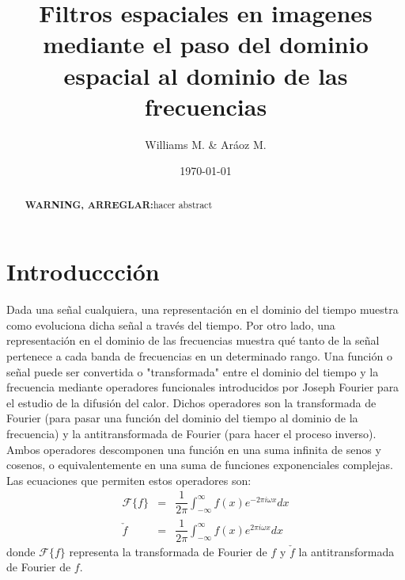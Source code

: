 \documentclass[11pt,a4paper]{emulateapj}
\def \warn {{\sffamily\bfseries\large WARNING, ARREGLAR:}}
\begin{document}
\title{Filtros espaciales en imagenes mediante el paso del dominio espacial al dominio de las frecuencias}
\author{Williams M. \& Aráoz M.}
\date{\today}


\begin{abstract}
\warn{hacer abstract}
\end{abstract}

\maketitle




\section{Introduccción}
\label{sec:introduccion}






Dada una señal cualquiera, una representación en el dominio del tiempo muestra como evoluciona dicha señal
a través del tiempo. Por otro lado, una representación en el dominio de las frecuencias muestra qué tanto de 
la señal pertenece a cada banda de frecuencias en un determinado rango. \citet*{wiki10} Una función o señal puede ser convertida
o "transformada" entre el dominio del tiempo y la frecuencia mediante operadores funcionales introducidos por 
Joseph Fourier para el estudio de la difusión del calor. Dichos operadores son la transformada de Fourier (para
pasar una función del dominio del tiempo al dominio de la frecuencia) y la antitransformada de Fourier (para hacer
el proceso inverso). Ambos operadores descomponen una función en una suma infinita de senos y cosenos, o equivalentemente
en una suma de funciones exponenciales complejas. \\

Las ecuaciones que permiten estos operadores son: \\
\begin{eqnarray}
\mathcal{F}\{f\} &=& \dfrac{1}{2\pi} \int_{-\infty}^{\infty} f(x)e^{-2\pi i \omega x} dx  \\
\check{f} &=& \dfrac{1}{2\pi} \int_{-\infty}^{\infty} f(x)e^{2\pi i \omega x} dx
\end{eqnarray}
donde $\mathcal{F}\{f\} $ representa la transformada de Fourier de $f$ y $\check{f}$ la antitransformada de Fourier de $f$.\\
\end{document}
